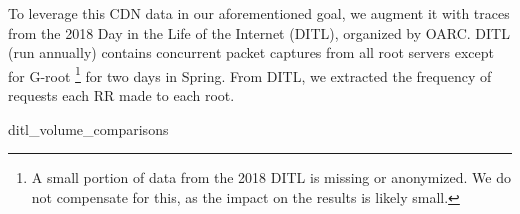 \documentclass[sigconf,nonacm,10pt]{acmart}
\begin{document}
To leverage this CDN data in our aforementioned goal, we augment it with
traces from the 2018 Day in the Life of the Internet (DITL), organized
by OARC. DITL (run annually) contains concurrent packet captures from
all root servers except for G-root
\footnote{ A small portion of data from the 2018 DITL is missing or anonymized. We do not compensate for this, as the impact on the results is likely small. }
for two days in Spring. From DITL, we extracted the frequency of
requests each RR made to each root.

ditl\_volume\_comparisons

\begin{table}[]
\centering
{}
\caption{Statistics displaying the extent to which the RR's of users in a large CDN represent RR's seen in the 2018 DITL captures. Further, it shows the extent to which RR's of RIPE probes represent the 2018 DITL captures.}
\label{tab:dataset_matching_statistics}
\end{table}
\end{document}
